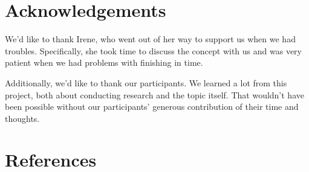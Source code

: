 \documentclass[]{vutinfth}
\begin{document}
\hypertarget{acknowledgements}{%
\chapter{Acknowledgements}\label{acknowledgements}}

We'd like to thank Irene, who went out of her way to support us when we
had troubles. Specifically, she took time to discuss the concept with us
and was very patient when we had problems with finishing in time.

Additionally, we'd like to thank our participants. We learned a lot from
this project, both about conducting research and the topic itself. That
wouldn't have been possible without our participants' generous
contribution of their time and thoughts.

\hypertarget{references}{%
\chapter{References}\label{references}}
\end{document}
